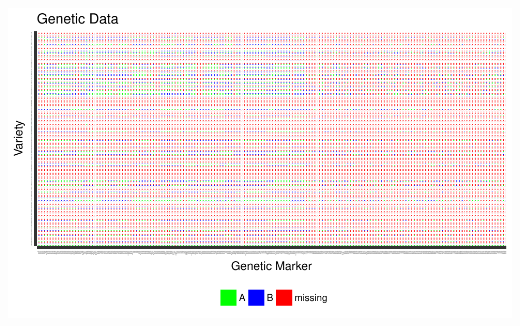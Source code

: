 \documentclass[11pt]{article}\usepackage[]{graphicx}\usepackage[]{color}
\makeatletter
\def\maxwidth{ %
  \ifdim\Gin@nat@width>\linewidth
    \linewidth
  \else
    \Gin@nat@width
  \fi
}
\newenvironment{knitrout}{}{} %
\makeatother
\begin{document}
\begin{knitrout}\footnotesize
{}\color{fgcolor}

{\centering \includegraphics[width=\maxwidth]{figure/missing_plot-1} 

}



\end{knitrout}
\end{document}
